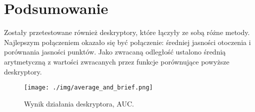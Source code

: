 \documentclass[a4paper,11pt]{article}
\begin{document}
\section{Podsumowanie}
Zostały przetestowane również deskryptory, które łączyły ze sobą różne metody.
Najlepszym połączeniem okazało się być połączenie: średniej jasności otoczenia i porównania jasności punktów.
Jako zwracaną odległość ustalono średnią arytmetyczną z wartości zwracanych przez funkcje porównujące powyższe deskryptory.

\begin{figure}[H]
\begin{center}
\texttt{[image: ./img/average\_and\_brief.png]}
\end{center}
\caption{Wynik działania deskryptora, AUC.}
\end{figure}
\end{document}
